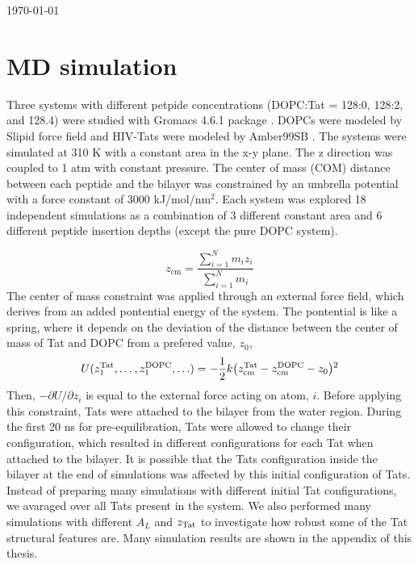 \documentclass[12pt,letterpaper]{article}
\begin{document}
\today

\section{MD simulation}
Three systems with different petpide concentrations (DOPC:Tat = 128:0, 128:2, and 128.4)
were studied with Gromacs 4.6.1 package \cite{ref:Hess08}. DOPCs were modeled by Slipid 
force field \cite{ref:Jambeck12_JPCB,ref:Jambeck12_JCTC} and HIV-Tats
were modeled by Amber99SB \cite{ref:Hornak06}. The systems were simulated at 
310 K with a constant
area in the x-y plane. The z direction was coupled to 1 atm with constant pressure. The
center of mass (COM) distance between each peptide and the bilayer was constrained by an
umbrella potential with a force constant of 3000 kJ/mol/nm$^2$. Each system was explored
18 independent simulations as a combination of 3 different constant area and 6 different
peptide insertion depths (except the pure DOPC system).

\begin{equation}
  z_{\mathrm{cm}} = \frac{\sum_{i=1}^N m_iz_i}{\sum_{i=1}^N m_i}
\end{equation}
The center of mass constraint was applied through an external force field,
which derives from an added pontential energy of the system. The pontential 
is like a spring, where it depends on the deviation of the distance 
between the center of mass of Tat and DOPC from a prefered value, $z_0$,
\begin{equation}
  U(z_1^{\mathrm{Tat}},\ldots,z_1^{\mathrm{DOPC}},\ldots) = 
  -\frac{1}{2} k 
  \mathopen{}\left( z_{\mathrm{cm}}^{\mathrm{Tat}} - z_{\mathrm{cm}}^{\mathrm{DOPC}} - z_0 \right)\mathclose{}^2
\end{equation}
Then, $-\partial U/\partial z_i$ is equal to the external force acting 
on atom, $i$. Before applying this constraint, Tats were attached to 
the bilayer from the water region. During the first 20 ns for 
pre-equilibration, Tats were allowed to change their configuration,
which resulted in different configurations for each Tat when attached
to the bilayer. It is possible that the Tats configuration inside the
bilayer at the end of simulations was affected by this initial 
configuration of Tats. Instead of preparing many simulations with
different initial Tat configurations, we avaraged over all Tats
present in the system. We also performed many simulations with
different $A_L$ and $z_{\mathrm{Tat}}$ to investigate how robust some of the 
Tat structural features are. Many simulation results are shown in
the appendix of this thesis. 
\end{document}

